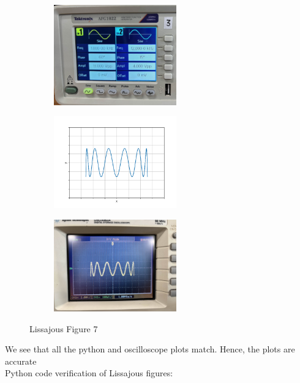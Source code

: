 \documentclass[a4paper,12pt]{article}
\begin{document}
\begin{enumerate}
\begin{figure}[h!]
	\begin{subfigure}[b]{10pt}
		\includegraphics[width = 150pt]{figs/fig7.jpeg}
	\end{subfigure}
	\hspace{135pt}
	\begin{subfigure}[b]{10pt}
		\includegraphics[width = 150pt]{figs/fig7.png}
	\end{subfigure}
	\hspace{135pt}
	\begin{subfigure}[b]{10pt}
		\includegraphics[width = 150pt]{figs/fig7_1.jpeg}
	\end{subfigure}
	\caption{Lissajous Figure 7}
\end{figure}
\end{enumerate}
We see that all the python and oscilloscope plots match. Hence, the plots are accurate\\
Python code verification of Lissajous figures:\\
\end{document}
